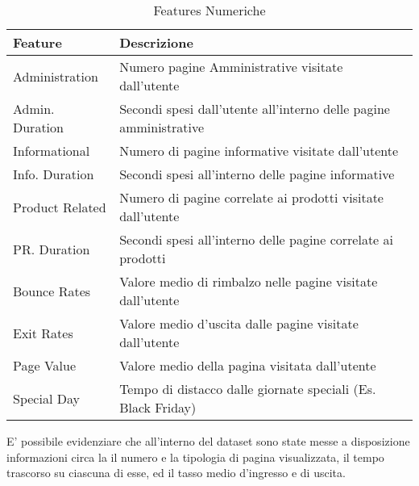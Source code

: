 \documentclass[10pt,a4paper]{article}
\begin{document}
\begin{table}[h] 
\centering
\begin{tabular}{l l}
\hline
\textbf{Feature} & \textbf{Descrizione}\\
\hline
Administration & Numero pagine Amministrative visitate dall'utente \\
Admin. Duration & Secondi spesi dall'utente all'interno delle pagine amministrative \\
Informational & Numero di pagine informative visitate dall'utente \\
Info. Duration & Secondi spesi all'interno delle pagine informative \\
Product Related & Numero di pagine correlate ai prodotti visitate dall'utente \\
PR. Duration & Secondi spesi all'interno delle pagine correlate ai prodotti \\
Bounce Rates & Valore medio di rimbalzo nelle pagine visitate dall'utente \\
Exit Rates & Valore medio d'uscita dalle pagine visitate dall'utente \\
Page Value & Valore medio della pagina visitata dall'utente  \\
Special Day & Tempo di distacco dalle giornate speciali (Es. Black Friday) \\
\hline
\end{tabular}
\caption{Features Numeriche}
\label{tab:example}
\end{table}

E' possibile evidenziare che all'interno del dataset sono state messe a disposizione informazioni circa la il numero e la tipologia di pagina visualizzata, il tempo trascorso su ciascuna di esse, ed il tasso medio d'ingresso e di uscita.
\hfill \break
\end{document}
